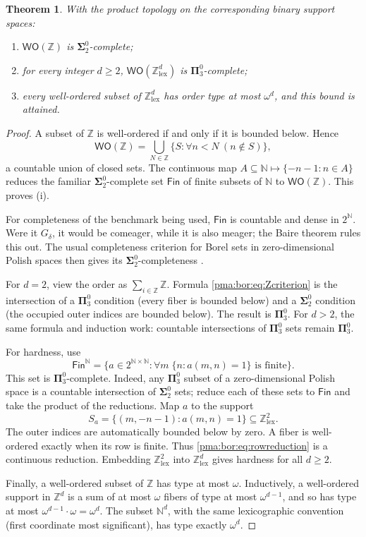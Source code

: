\documentclass[11pt]{article}
\numberwithin{equation}{section}
\newtheorem{theorem}{Theorem}[section]
\theoremstyle{definition}
\theoremstyle{remark}
\newcommand{\N}{\mathbb N}
\newcommand{\Z}{\mathbb Z}
\newcommand{\WO}{\mathsf{WO}}
\newcommand{\Fin}{\mathsf{Fin}}
\begin{document}
\begin{theorem}
\label{pma:bor:thm:finitelex}
With the product topology on the corresponding binary support spaces:
\begin{enumerate}[label=(\roman*)]
\item $\WO(\Z)$ is $\boldsymbol\Sigma^0_2$-complete;
\item for every integer $d\geq2$, $\WO(\Z^d_{\mathrm{lex}})$ is
$\boldsymbol\Pi^0_3$-complete;
\item every well-ordered subset of $\Z^d_{\mathrm{lex}}$ has order type at
most $\omega^d$, and this bound is attained.
\end{enumerate}
\end{theorem}
\begin{proof}
A subset of $\Z$ is well-ordered if and only if it is bounded below. Hence
\[
 \WO(\Z)=\bigcup_{N\in\Z}
 \{S:\forall n<N\ (n\notin S)\},
\]
a countable union of closed sets. The continuous map
$A\subseteq\N\mapsto\{-n-1:n\in A\}$ reduces the familiar
$\boldsymbol\Sigma^0_2$-complete set $\Fin$ of finite subsets of $\N$ to
$\WO(\Z)$. This proves (i).

For completeness of the benchmark being used, $\Fin$ is countable and dense
in $2^\N$. Were it $G_\delta$, it would be comeager, while it is also meager;
the Baire theorem rules this out. The usual completeness criterion for Borel
sets in zero-dimensional Polish spaces then gives its
$\boldsymbol\Sigma^0_2$-completeness \cite[Section 16.A]{Tserunyan}.

For $d=2$, view the order as $\sum_{i\in\Z}\Z$. Formula
\eqref{pma:bor:eq:Zcriterion} is the intersection of a
$\boldsymbol\Pi^0_3$ condition (every fiber is bounded below) and a
$\boldsymbol\Sigma^0_2$ condition (the occupied outer indices are bounded
below). The result is $\boldsymbol\Pi^0_3$.
For $d>2$, the same formula and induction work: countable intersections of
$\boldsymbol\Pi^0_3$ sets remain $\boldsymbol\Pi^0_3$.

For hardness, use
\[
 \Fin^\N=
 \{a\in2^{\N\times\N}:\forall m\;\{n:a(m,n)=1\}\text{ is finite}\}.
\]
This set is $\boldsymbol\Pi^0_3$-complete. Indeed, any
$\boldsymbol\Pi^0_3$ subset of a zero-dimensional Polish space is a countable
intersection of $\boldsymbol\Sigma^0_2$ sets; reduce each of these sets to
$\Fin$ and take the product of the reductions.
Map $a$ to the support
\begin{equation}
\label{pma:bor:eq:rowreduction}
 S_a=\{(m,-n-1):a(m,n)=1\}\subseteq\Z^2_{\mathrm{lex}}.
\end{equation}
The outer indices are automatically bounded below by zero. A fiber is
well-ordered exactly when its row is finite. Thus \eqref{pma:bor:eq:rowreduction} is
a continuous reduction. Embedding $\Z^2_{\mathrm{lex}}$ into
$\Z^d_{\mathrm{lex}}$ gives hardness for all $d\geq2$.

Finally, a well-ordered subset of $\Z$ has type at most $\omega$. Inductively,
a well-ordered support in $\Z^d$ is a sum of at most $\omega$ fibers of type
at most $\omega^{d-1}$, and so has type at most
$\omega^{d-1}\cdot\omega=\omega^d$. The subset $\N^d$, with the same
lexicographic convention (first coordinate most significant), has type exactly
$\omega^d$.
\end{proof}
\end{document}
